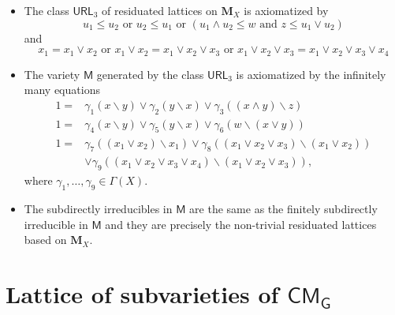 \documentclass[professionalfont, 10pt]{beamer} %
\theoremstyle{plain}
\theoremstyle{definition}
\begin{document}
\begin{frame}
    \begin{itemize}
        \item The class $\mathsf{URL}_3$ of residuated lattices on $\mathbf{M}_X$ is axiomatized by
        \begin{equation}\tag{URL}\label{axiom_URL}
        u_1 \leq u_2 \text{ or } u_2 \leq u_1 \text{ or } (u_1 \wedge u_2 \leq w \text{ and } z \leq u_1 \vee u_2)
        \end{equation}
        and
        \begin{equation}\tag{$h_3$}\label{axiom_of_finite_height}
            x_1 = x_1 \vee x_2 \text{ or } x_1 \vee x_2 = x_1 \vee x_2 \vee x_3 \text{ or } x_1 \vee x_2 \vee x_3 = x_1 \vee x_2 \vee x_3 \vee x_4
        \end{equation}\pause

        \item The variety $\mathsf{M}$ generated by the class $\mathsf{URL}_3$ is axiomatized by the infinitely many equations
        \begin{align*}
            1 = & \gamma_1(x \backslash y) \vee \gamma_2(y \backslash x) \vee \gamma_3 ((x \wedge y) \backslash z)\\
            1 = & \gamma_4(x \backslash y) \vee \gamma_5(y \backslash x) \vee \gamma_6 (w \backslash (x \vee y))\\
            1 = & \gamma_7((x_1 \vee x_2)\backslash x_1) \vee \gamma_8((x_1 \vee x_2 \vee x_3)\backslash (x_1 \vee x_2))\\
            & \vee \gamma_9((x_1 \vee x_2 \vee x_3 \vee x_4) \backslash (x_1 \vee x_2 \vee x_3)),
        \end{align*}
        where $ \gamma_1, \dots, \gamma_9 \in \Gamma(X)$.\pause

        \item The subdirectly irreducibles in $\mathsf{M}$ are the same as the finitely subdirectly irreducible in $\mathsf{M}$ and they are precisely the non-trivial residuated lattices based on $\mathbf{M}_X$.
    \end{itemize}
\end{frame}

\section{Lattice of subvarieties of $\mathsf{CM_G}$}
\end{document}

